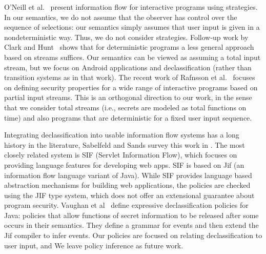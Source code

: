 \documentclass[10pt,conference,compsocconf]{IEEEtran}
\begin{document}
O'Neill et al.~\cite{O'Neill:06} present information flow for
interactive programs using strategies. In our semantics, we do not
assume that the observer has control over the sequence of selections:
our semantics simply assumes that user input is given in a
nondeterministic way.  Thus, we do not consider strategies.  Follow-up
work by Clark and Hunt~\cite{Clark:09} shows that for deterministic
programs a less general approach based on streams suffices.  Our
semantics can be viewed as assuming a total input stream, but we focus
on Android applications and declassification (rather than transition
systems as in that work). The recent work of 
Rafnsson et al.~\cite{Rafnsson:12} focuses on defining security
properties for a wide range of interactive programs 
based on partial input streams.  This is
an orthogonal direction to our work, in the sense that we consider
total streams (i.e., secrets are modeled as total functions on time)
and also programs that are deterministic for a fixed user input
sequence. 

Integrating declassification into usable information flow systems has
a long history in the literature, Sabelfeld and Sands survey this work
in \cite{Sabelfeld:05}.  The most closely related system is SIF
(Servlet Information Flow), which focuses on providing language
features for developing web apps.  SIF is based on Jif \cite{Myers:1999} (an information
flow language variant of Java).  While SIF provides language based
abstraction mechanisms for building web applications, the policies are
checked using the JIF type system, which does not offer an extensional
guarantee about program security.  Vaughan et al~\cite{Vaughan:2011}
define expressive declassification policies for Java: policies that
allow functions of secret information to be released after some
occurs in their semantics.  They define a grammar for events and then
extend the Jif compiler to infer events.  Our policies are focused on
relating declassification to user input, and We leave policy inference as
future work.


\end{document}
